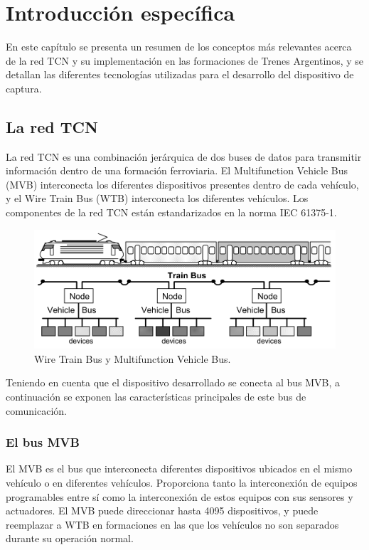 \chapter{Introducción específica}

En este capítulo se presenta un resumen de los conceptos más relevantes acerca de la red TCN y su implementación en las formaciones de Trenes Argentinos, y se detallan las diferentes tecnologías utilizadas para el desarrollo del dispositivo de captura.

\section{La red TCN}

La red TCN es una combinación jerárquica de dos buses de datos para transmitir información dentro de una formación ferroviaria. El Multifunction Vehicle Bus (MVB) interconecta los diferentes dispositivos presentes dentro de cada vehículo, y el Wire Train Bus (WTB) interconecta los diferentes vehículos. Los componentes de la red TCN están estandarizados en la norma IEC 61375-1.

\begin{figure}[htbp]
	\centering
	\includegraphics[width=.8\textwidth]{./Figures/tcn-mvb-wtb.png}
	\caption[Wire Train Bus y Multifunction Vehicle Bus]{Wire Train Bus y Multifunction Vehicle Bus.
        \\ }
\end{figure}

Teniendo en cuenta que el dispositivo desarrollado se conecta al bus MVB, a continuación se exponen las características principales de este bus de comunicación.

\subsection{El bus MVB}

El MVB es el bus que interconecta diferentes dispositivos ubicados en el mismo vehículo o en diferentes vehículos. Proporciona tanto la interconexión de equipos programables entre sí como la interconexión de estos equipos con sus sensores y actuadores. El MVB puede direccionar hasta 4095 dispositivos, y puede reemplazar a WTB en formaciones en las que los vehículos no son separados durante su operación normal.


